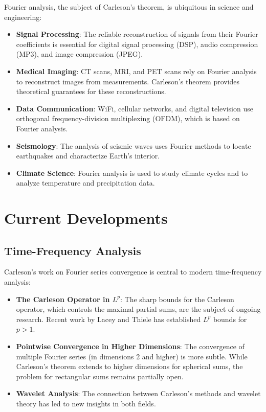 Fourier analysis, the subject of Carleson's theorem, is ubiquitous in science and engineering:

\begin{itemize}
\item \textbf{Signal Processing}: The reliable reconstruction of signals from their Fourier coefficients is essential for digital signal processing (DSP), audio compression (MP3), and image compression (JPEG).

\item \textbf{Medical Imaging}: CT scans, MRI, and PET scans rely on Fourier analysis to reconstruct images from measurements. Carleson's theorem provides theoretical guarantees for these reconstructions.

\item \textbf{Data Communication}: WiFi, cellular networks, and digital television use orthogonal frequency-division multiplexing (OFDM), which is based on Fourier analysis.

\item \textbf{Seismology}: The analysis of seismic waves uses Fourier methods to locate earthquakes and characterize Earth's interior.

\item \textbf{Climate Science}: Fourier analysis is used to study climate cycles and to analyze temperature and precipitation data.
\end{itemize}

\section{Current Developments}

\subsection{Time-Frequency Analysis}

Carleson's work on Fourier series convergence is central to modern time-frequency analysis:

\begin{itemize}
\item \textbf{The Carleson Operator in $L^p$}: The sharp bounds for the Carleson operator, which controls the maximal partial sums, are the subject of ongoing research. Recent work by Lacey and Thiele has established $L^p$ bounds for $p > 1$.

\item \textbf{Pointwise Convergence in Higher Dimensions}: The convergence of multiple Fourier series (in dimensions 2 and higher) is more subtle. While Carleson's theorem extends to higher dimensions for spherical sums, the problem for rectangular sums remains partially open.

\item \textbf{Wavelet Analysis}: The connection between Carleson's methods and wavelet theory has led to new insights in both fields.
\end{itemize}

